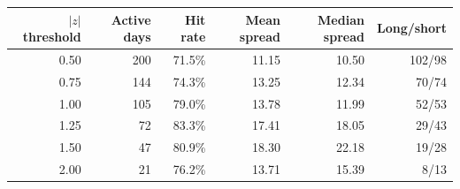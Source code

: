 \begin{tabular}{rrrrrr}
\toprule
$|z|$ threshold & Active days & Hit rate & Mean spread & Median spread & Long/short \\
\midrule
0.50 & 200 & 71.5\% & 11.15 & 10.50 & 102/98 \\
0.75 & 144 & 74.3\% & 13.25 & 12.34 & 70/74 \\
1.00 & 105 & 79.0\% & 13.78 & 11.99 & 52/53 \\
1.25 & 72 & 83.3\% & 17.41 & 18.05 & 29/43 \\
1.50 & 47 & 80.9\% & 18.30 & 22.18 & 19/28 \\
2.00 & 21 & 76.2\% & 13.71 & 15.39 & 8/13 \\
\bottomrule
\end{tabular}
